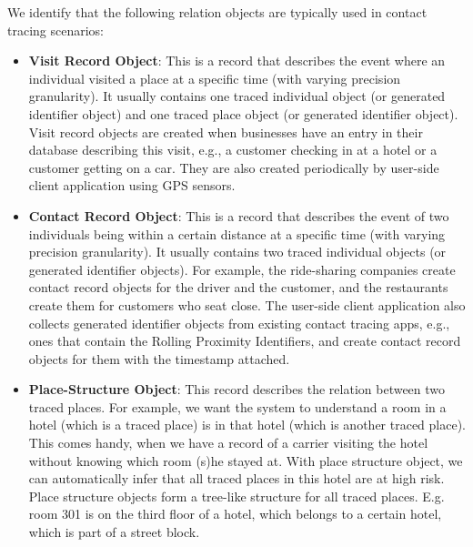 \documentclass[11pt]{article}  %
\begin{document}
 We identify that the following relation objects are typically used in contact tracing scenarios:
        \begin{itemize}
            \item \textbf{Visit Record Object}: This is a record that describes the event where an individual visited a place at a specific time (with varying precision granularity). It usually contains one traced individual object (or generated identifier object) and one traced place object (or generated identifier object). Visit record objects are created when businesses have an entry in their database describing this visit, e.g., a customer checking in at a hotel or a customer getting on a car. They are also created periodically by user-side client application using GPS sensors. 
            \item \textbf{Contact Record Object}: This is a record that describes the event of two individuals being within a certain distance at a specific time (with varying precision granularity). It usually contains two traced individual objects (or generated identifier objects). For example, the ride-sharing companies create contact record objects for the driver and the customer, and the restaurants create them for customers who seat close. The user-side client application also collects generated identifier objects from existing contact tracing apps, e.g., ones that contain the Rolling Proximity Identifiers, and create contact record objects for them with the timestamp attached.

            \item \textbf{Place-Structure Object}: This record describes the relation between two traced places. For example, we want the system to understand a room in a hotel (which is a traced place) is in that hotel (which is another traced place). This comes handy, when we have a record of a carrier visiting the hotel without knowing which room (s)he stayed at. With place structure object, we can automatically infer that all traced places in this hotel are at high risk. Place structure objects form a tree-like structure for all traced places. E.g. room 301 is on the third floor of a hotel, which belongs to a certain hotel,  which is part of a street block.
        \end{itemize}
\end{document}
